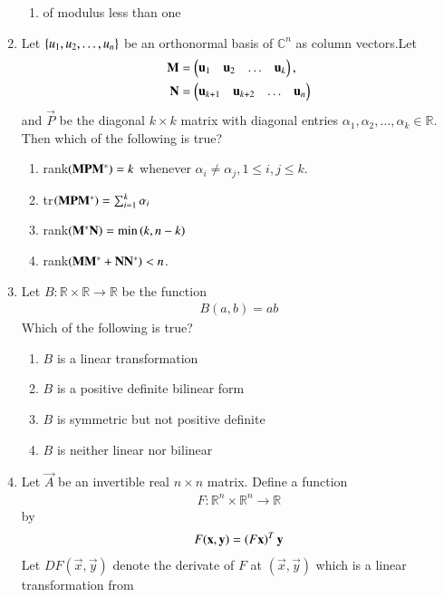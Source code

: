 \begin{enumerate}[label=\thesection.\arabic*.,ref=\thesection.\theenumi]
\begin{enumerate}
\item of modulus less than one
\end{enumerate}  
%
\item Let $\left\{u_1,u_2,\dots, u_n\right\}$ be an orthonormal basis of $\mathbb{C}^n$ as column vectors.Let 
\begin{align}
\mathbf{M} &= \begin{pmatrix}\mathbf{u}_1 & \mathbf{u}_2 & \dots & \mathbf{u}_k\end{pmatrix},
\\
\mathbf{N} &= \begin{pmatrix}\mathbf{u}_{k+1} & \mathbf{u}_{k+2} & \dots & \mathbf{u}_n\end{pmatrix}
\end{align}
%
and $\vec{P}$ be the diagonal $k \times k$ matrix with diagonal entries $\alpha_1,\alpha_2, \dots, \alpha_k \in \mathbb{R}$.  Then which of the following is true?
\begin{enumerate}
\item rank$\left(\mathbf{M}\mathbf{P}\mathbf{M}^*\right) = k$ whenever $\alpha_i \ne \alpha_j, 1 \le i, j \le k$.
\item tr$\left(\mathbf{M}\mathbf{P}\mathbf{M}^*\right) = \sum_{i=1}^{k}\alpha_i$
\item rank$\left(\mathbf{M}^*\mathbf{N}\right) = \min\left(k,n-k\right)$
\item rank$\left(\mathbf{M}\mathbf{M}^*+\mathbf{N}\mathbf{N}^*\right)  < n$.
\end{enumerate}  
%
\item Let $B: \mathbb{R} \times \mathbb{R} \to \mathbb{R}$ be the function
\begin{align}
B(a,b) = ab
\end{align}
Which of the following is true?
\begin{enumerate}
\item $B$ is a linear transformation
\item $B$ is a positive definite bilinear form
\item $B$ is symmetric but not positive definite
\item $B$ is neither linear nor bilinear
\end{enumerate}  
%
\item Let $\vec{A}$ be an invertible real $n \times n$ matrix.  Define a function
\begin{align}
F: \mathbb{R}^n \times \mathbb{R}^n \to \mathbb{R}
\end{align}
by 
\begin{align}
F(\mathbf{x},\mathbf{y}) = \left(F\mathbf{x}\right)^T\mathbf{y}
\end{align}
Let $DF(\vec{x},\vec{y}) $ denote the derivate of $F$ at $(\vec{x},\vec{y}) $ which is 
a linear transformation from 
\begin{align}

\end{align}
\end{enumerate}
